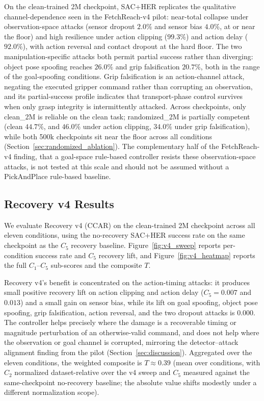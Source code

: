 \documentclass[conference]{IEEEtran}
\begin{document}
On the clean-trained 2M checkpoint, SAC+HER replicates the qualitative
channel-dependence seen in the FetchReach-v4 pilot: near-total collapse under
observation-space attacks (sensor dropout $2.0\%$ and sensor bias $4.0\%$, at or near
the floor) and high resilience under action clipping ($99.3\%$) and action delay
($92.0\%$), with action reversal and contact dropout at the hard floor. The two
manipulation-specific attacks both permit partial success rather than diverging: object
pose spoofing reaches $26.0\%$ and grip falsification $20.7\%$, both in the range of the
goal-spoofing conditions. Grip falsification is an action-channel attack, negating the
executed gripper command rather than corrupting an observation, and its partial-success
profile indicates that transport-phase control survives when only grasp integrity is
intermittently attacked. Across checkpoints, only clean\_2M is reliable on the clean
task; randomized\_2M is partially competent (clean $44.7\%$, and $46.0\%$ under action
clipping, $34.0\%$ under grip falsification), while both 500k checkpoints sit near the
floor across all conditions (Section~\ref{sec:randomized_ablation}). The complementary
half of the FetchReach-v4 finding, that a goal-space rule-based controller resists these
observation-space attacks, is not tested at this scale and should not be assumed without
a PickAndPlace rule-based baseline.

\subsection{Recovery v4 Results}
\label{sec:recovery_results}

We evaluate Recovery v4 (CCAR) on the clean-trained 2M checkpoint across all eleven
conditions, using the no-recovery SAC+HER success rate on the same checkpoint as the
$C_5$ recovery baseline. Figure~\ref{fig:v4_sweep} reports per-condition success rate and
$C_5$ recovery lift, and Figure~\ref{fig:v4_heatmap} reports the full $C_1$--$C_5$
sub-scores and the composite $T$.

Recovery v4's benefit is concentrated on the action-timing attacks: it produces small
positive recovery lift on action clipping and action delay ($C_5 = 0.007$ and $0.013$)
and a small gain on sensor bias, while its lift on goal spoofing, object pose spoofing,
grip falsification, action reversal, and the two dropout attacks is $0.000$. The
controller helps precisely where the damage is a recoverable timing or magnitude
perturbation of an otherwise-valid command, and does not help where the observation or
goal channel is corrupted, mirroring the detector--attack alignment finding from the
pilot (Section~\ref{sec:discussion}). Aggregated over the eleven conditions, the weighted
composite is $T \approx 0.39$ (mean over conditions, with $C_2$ normalized
dataset-relative over the v4 sweep and $C_5$ measured against the same-checkpoint
no-recovery baseline; the absolute value shifts modestly under a different normalization
scope).
\end{document}

